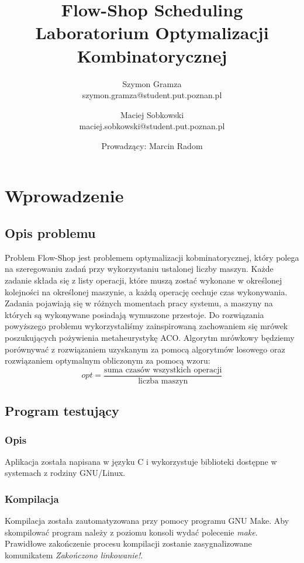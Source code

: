 \documentclass[10pt,a4paper]{article}
\title{Flow-Shop Scheduling\\Laboratorium Optymalizacji Kombinatorycznej}
\author{Szymon Gramza\\
  szymon.gramza@student.put.poznan.pl
\and
  Maciej Sobkowski\\
  maciej.sobkowski@student.put.poznan.pl
\and
  Prowadzący: Marcin Radom
}
\begin{document}
\maketitle
\section{Wprowadzenie}
\subsection{Opis problemu}
Problem Flow-Shop jest problemem optymalizacji kobminatorycznej, który polega na
szeregowaniu zadań przy wykorzystaniu ustalonej liczby maszyn. Każde zadanie
składa się z listy operacji, które muszą zostać wykonane w określonej kolejności
na określonej maszynie, a każdą operację cechuje czas wykonywania. Zadania
pojawiają się w różnych momentach pracy systemu, a maszyny na których są
wykonywane posiadają wymuszone przestoje.  Do rozwiązania powyższego problemu
wykorzystaliśmy zainspirowaną zachowaniem się mrówek poszukujących pożywienia
metaheurystykę ACO\@. Algorytm mrówkowy będziemy porównywać z rozwiązaniem
uzyskanym za pomocą algorytmów losowego oraz rozwiązaniem optymalnym obliczonym
za pomocą wzoru: 
\[ opt = \frac{\text{suma\ czasów\ wszystkich
operacji}}{\text{liczba\ maszyn}} \]

\subsection{Program testujący}
\subsubsection{Opis}
Aplikacja została napisana w języku C i wykorzystuje biblioteki dostępne w
systemach z rodziny GNU/Linux. 
\subsubsection{Kompilacja}
Kompilacja została zautomatyzowana przy pomocy programu GNU Make. Aby
skompilować program należy z poziomu konsoli wydać polecenie \textit{make}.
Prawidłowe zakończenie procesu kompilacji zostanie zasygnalizowane komunikatem
\textit{Zakończono linkowanie!}.
\end{document}
